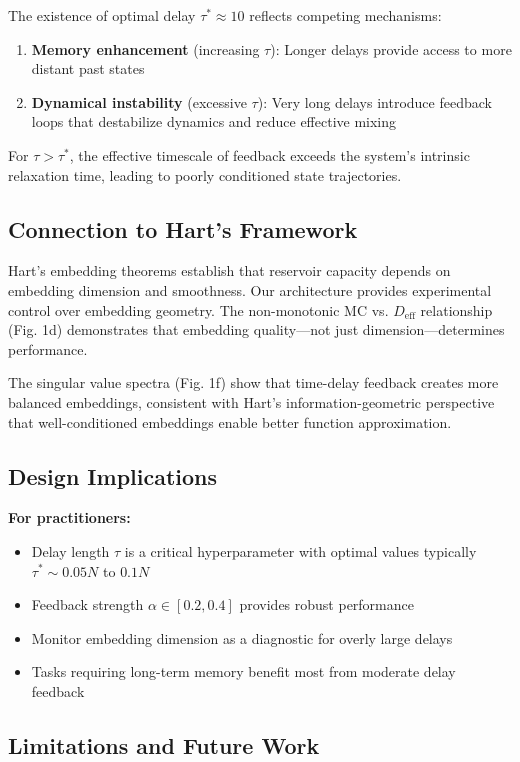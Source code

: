 \documentclass[11pt]{article}
\begin{document}
The existence of optimal delay $\tau^* \approx 10$ reflects competing mechanisms:
\begin{enumerate}
\item \textbf{Memory enhancement} (increasing $\tau$): Longer delays provide access to more distant past states
\item \textbf{Dynamical instability} (excessive $\tau$): Very long delays introduce feedback loops that destabilize dynamics and reduce effective mixing
\end{enumerate}

For $\tau > \tau^*$, the effective timescale of feedback exceeds the system's intrinsic relaxation time, leading to poorly conditioned state trajectories.

\subsection{Connection to Hart's Framework}

Hart's embedding theorems \cite{hart2021thesis} establish that reservoir capacity depends on embedding dimension and smoothness. Our architecture provides experimental control over embedding geometry. The non-monotonic MC vs. $D_{\text{eff}}$ relationship (Fig. 1d) demonstrates that embedding quality—not just dimension—determines performance.

The singular value spectra (Fig. 1f) show that time-delay feedback creates more balanced embeddings, consistent with Hart's information-geometric perspective that well-conditioned embeddings enable better function approximation.

\subsection{Design Implications}

\textbf{For practitioners:}
\begin{itemize}
\item Delay length $\tau$ is a critical hyperparameter with optimal values typically $\tau^* \sim 0.05N$ to $0.1N$
\item Feedback strength $\alpha \in [0.2, 0.4]$ provides robust performance
\item Monitor embedding dimension as a diagnostic for overly large delays
\item Tasks requiring long-term memory benefit most from moderate delay feedback
\end{itemize}

\subsection{Limitations and Future Work}
\end{document}
